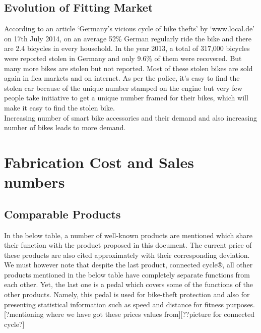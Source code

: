 \documentclass{article}
\begin{document}
	\subsection{Evolution of Fitting Market}
	According to an article ‘Germany’s vicious cycle of bike thefts’ by ‘www.local.de’ on 17th July 2014, on an average 52\% German regularly ride the bike and there are 2.4 bicycles in every household. In the year 2013, a total of 317,000 bicycles were reported stolen in Germany and only 9.6\% of them were recovered. But many more bikes are stolen but not reported. Most of these stolen bikes are sold again in flea markets and on internet. As per the police, it’s easy to find the stolen car because of the unique number stamped on the engine but very few people take initiative to get a unique number framed for their bikes, which will make it easy to find the stolen bike.\\  
	Increasing number of smart bike accessories and their demand and also increasing number of bikes leads to more demand.
	
	
	
	
	
	
	\newpage
	\section{Fabrication Cost and Sales numbers}
	
	\subsection{Comparable Products}
	In the below table, a number of well-known products are mentioned which share their function with the product proposed in this document. The current price of these products are also cited approximately with their corresponding deviation. We must however note that despite the last product, connected cycle®, all other products mentioned in the below table have completely separate functions from each other. Yet, the last one is a pedal which covers some of the functions of the other products. Namely, this pedal is used for bike-theft protection and also for presenting statistical information such as speed and distance for fitness purposes. [?mentioning where we have got these prices values from][??picture for connected cycle?]\\
	
\end{document}
